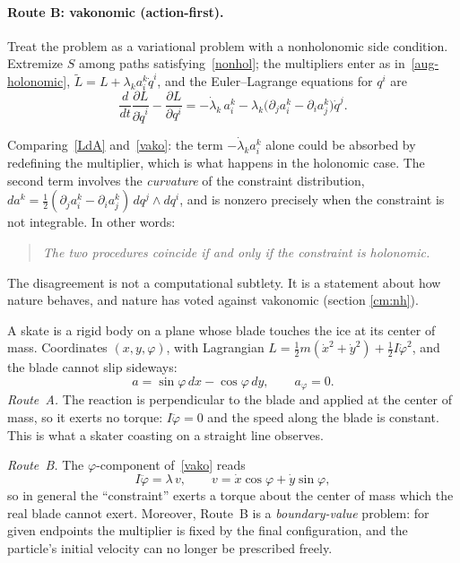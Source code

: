 \paragraph{Route B: vakonomic (action-first).}
Treat the problem as a variational problem with a nonholonomic side
condition. Extremize $S$ among paths satisfying~\eqref{nonhol}; the
multipliers enter as in~\eqref{aug-holonomic},
$\tilde L=L+\lambda_k a^k_i\dot q^i$, and the Euler--Lagrange equations
for $q^i$ are
\begin{equation}
  \frac{d}{dt}\frac{\partial L}{\partial\dot q^i}-\frac{\partial L}{\partial q^i}
  =-\dot\lambda_k\,a^k_i-\lambda_k\bigl(\partial_ja^k_i-\partial_ia^k_j\bigr)\dot q^j .
  \label{vako}
\end{equation}

Comparing~\eqref{LdA} and~\eqref{vako}: the term $-\dot\lambda_ka^k_i$
alone could be absorbed by redefining the multiplier, which is what happens
in the holonomic case. The second term involves the \emph{curvature} of the
constraint distribution, $d a^k=\tfrac12(\partial_ja^k_i-\partial_ia^k_j)\,dq^j\wedge dq^i$,
and is nonzero precisely when the constraint is not integrable. In other
words:
\begin{quote}
\emph{The two procedures coincide if and only if the constraint is
holonomic.}
\end{quote}
The disagreement is not a computational subtlety. It is a statement about
how nature behaves, and nature has voted against vakonomic (section \ref{cm:nh}).

\begin{example}[A skate]\label{skate}
A skate is a rigid body on a plane whose blade touches the ice at its center
of mass. Coordinates $(x,y,\varphi)$, with Lagrangian
$L=\tfrac12m(\dot x^2+\dot y^2)+\tfrac12I\dot\varphi^2$, and the blade cannot
slip sideways:
\[
  a=\sin\varphi\,dx-\cos\varphi\,dy,\qquad a_\varphi=0 .
\]
\emph{Route~A.} The reaction is perpendicular to the blade and applied at the
center of mass, so it exerts no torque: $I\ddot\varphi=0$ and the speed along
the blade is constant. This is what a skater coasting on a straight line
observes.

\emph{Route~B.} The $\varphi$-component of~\eqref{vako} reads
\[
  I\ddot\varphi=\lambda\,v,\qquad v=\dot x\cos\varphi+\dot y\sin\varphi,
\]
so in general the ``constraint'' exerts a torque about the center of mass
which the real blade cannot exert. Moreover, Route~B is a
\emph{boundary-value} problem: for given endpoints the multiplier is fixed
by the final configuration, and the particle's initial velocity can no longer be
prescribed freely.
\end{example}

